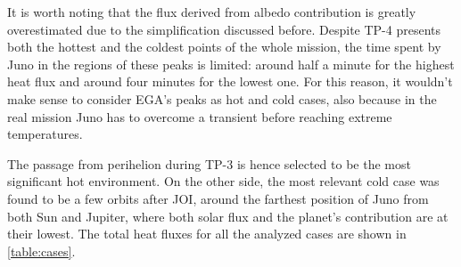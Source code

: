 \vspace*{4mm}

It is worth noting that the flux derived from albedo contribution is greatly overestimated due to the simplification discussed before.
Despite TP-4 presents both the hottest and the coldest points of the whole mission, the time spent by Juno in the regions of these peaks is limited: around half a minute for the highest heat flux and around four minutes for the lowest one.
For this reason, it wouldn't make sense to consider EGA's peaks as hot and cold cases, also because in the real mission Juno has to overcome a transient before reaching extreme temperatures.

The passage from perihelion during TP-3 is hence selected to be the most significant hot environment.
On the other side, the most relevant cold case was found to be a few orbits after JOI, around the farthest position of Juno from both Sun and Jupiter, where both solar flux and the planet's contribution are at their lowest.
The total heat fluxes for all the analyzed cases are shown in \autoref{table:cases}.